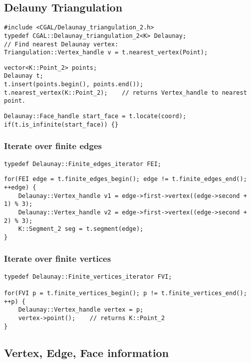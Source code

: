 \documentclass[11pt]{article}
\begin{document}
\subsection{Delauny Triangulation}
\begin{lstlisting}
#include <CGAL/Delaunay_triangulation_2.h>
typedef CGAL::Delaunay_triangulation_2<K> Delaunay;
// Find nearest Delaunay vertex:
Triangulation::Vertex_handle v = t.nearest_vertex(Point);
\end{lstlisting}

\begin{lstlisting}
vector<K::Point_2> points;
Delaunay t;
t.insert(points.begin(), points.end());
t.nearest_vertex(K::Point_2);    // returns Vertex_handle to nearest point.
\end{lstlisting}

\begin{lstlisting}
Delaunay::Face_handle start_face = t.locate(coord);
if(t.is_infinite(start_face)) {}
\end{lstlisting}
      
\subsubsection{Iterate over finite edges}
\begin{lstlisting}
typedef Delaunay::Finite_edges_iterator FEI;
\end{lstlisting}

\begin{lstlisting}
for(FEI edge = t.finite_edges_begin(); edge != t.finite_edges_end(); ++edge) {
    Delaunay::Vertex_handle v1 = edge->first->vertex((edge->second + 1) % 3);
    Delaunay::Vertex_handle v2 = edge->first->vertex((edge->second + 2) % 3);
    K::Segment_2 seg = t.segment(edge);
}
\end{lstlisting}

    
\subsubsection{Iterate over finite vertices}
\begin{lstlisting}
typedef Delaunay::Finite_vertices_iterator FVI;

for(FVI p = t.finite_vertices_begin(); p != t.finite_vertices_end(); ++p) {
    Delaunay::Vertex_handle vertex = p;
    vertex->point();    // returns K::Point_2
}
\end{lstlisting}

\subsection{Vertex, Edge, Face information}
\end{document}
